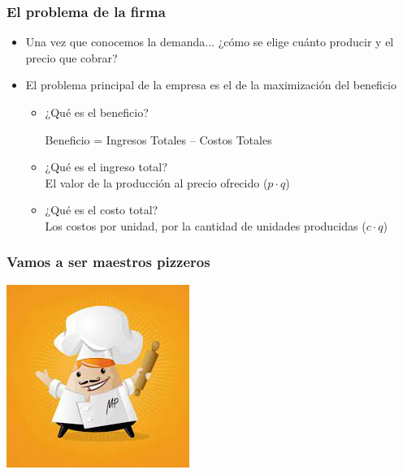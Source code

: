 \documentclass{beamer}
\begin{document}
\begin{frame}
\frametitle{El problema de la firma}
\begin{itemize}
    \item Una vez que conocemos la demanda... ¿cómo se elige cuánto producir y el precio que cobrar?
    \vspace{2mm}
    \item El problema principal de la empresa es el de la maximización del beneficio
    \begin{itemize}
        \item ¿Qué es el beneficio? \vspace{2mm} \\
        \begin{center} 
        Beneficio = Ingresos Totales – Costos Totales
        \end{center}
        \vspace{2mm}
        \item ¿Qué es el ingreso total? 
        \vspace{2mm} \\ 
        El valor de la producción al precio ofrecido ($p \cdot q$)
        \vspace{2mm}
        \item ¿Qué es el costo total?
        \vspace{2mm} \\ 
        Los costos por unidad, por la cantidad de unidades producidas ($c \cdot q$)
    \end{itemize} 
\end{itemize} 
\end{frame}

\begin{frame}
\frametitle{Vamos a ser maestros pizzeros}
\centering
\includegraphics[scale=0.6]{../Figures/Tema_06.12_maestrospizzeros.jpg}
\end{frame}
\end{document}
